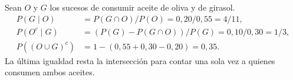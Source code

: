 Sean $O$ y $G$ los sucesos de consumir aceite de oliva y de girasol.
\[
\begin{aligned}
P(G\mid O)&=P(G\cap O)/P(O)=0{,}20/0{,}55=\boxed{4/11},\\
P(O^c\mid G)&=(P(G)-P(G\cap O))/P(G)=0{,}10/0{,}30=\boxed{1/3},\\
P((O\cup G)^c)&=1-(0{,}55+0{,}30-0{,}20)=\boxed{0{,}35}.
\end{aligned}
\]
La última igualdad resta la intersección para contar una sola vez a quienes consumen ambos aceites.
